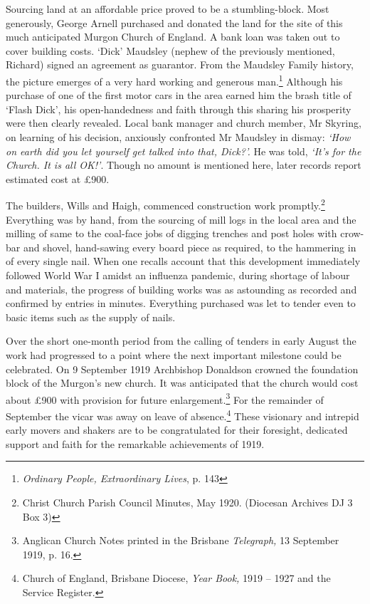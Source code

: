 Sourcing land at an affordable price proved to be a stumbling-block. Most generously, George Arnell purchased and donated the land for the site of this much anticipated Murgon Church of England. A bank loan was taken out to cover building costs. `Dick' Maudsley (nephew of the previously mentioned, Richard) signed an agreement as guarantor. From the Maudsley Family history, the picture emerges of a very hard working and generous man.\footnote{\emph{Ordinary People, Extraordinary Lives}, p. 143} Although his purchase of one of the first motor cars in the area earned him the brash title of `Flash Dick', his open-handedness and faith through this sharing his prosperity were then clearly revealed. Local bank manager and church member, Mr Skyring, on learning of his decision, anxiously confronted Mr Maudsley in dismay: \emph{`How on earth did you let yourself get talked into that, Dick?'.} He was told, \emph{`It's for the Church. It is all OK!'}. Though no amount is mentioned here, later records report estimated cost at \pounds900.


The builders, Wills and Haigh, commenced construction work promptly.\footnote{Christ Church Parish Council Minutes, May 1920. (Diocesan Archives DJ 3 Box 3)} Everything was by hand, from the sourcing of mill logs in the local area and the milling of same to the coal-face jobs of digging trenches and post holes with crow-bar and shovel, hand-sawing every board piece as required, to the hammering in of every single nail. When one recalls account that this development immediately followed World War I amidst an influenza pandemic, during shortage of labour and materials, the progress of building works was as astounding as recorded and confirmed by entries in minutes. Everything purchased was let to tender even to basic items such as the supply of nails.


Over the short one-month period from the calling of tenders in early August the work had progressed to a point where the next important milestone could be celebrated. On 9 September 1919 Archbishop Donaldson crowned the foundation block of the Murgon's new church. It was anticipated that the church would cost about \pounds900 with provision for future enlargement.\footnote{Anglican Church Notes printed in the Brisbane \emph{Telegraph,} 13 September 1919, p. 16.} For the remainder of September the vicar was away on leave of absence.\footnote{Church of England, Brisbane Diocese, \emph{Year Book,} 1919 -- 1927 and the Service Register.} These visionary and intrepid early movers and shakers are to be congratulated for their foresight, dedicated support and faith for the remarkable achievements of 1919.


